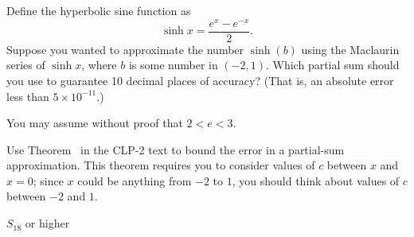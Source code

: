 \begin{question}
	Define the hyperbolic sine function as
	\[\sinh x = \frac{e^{x}-e^{-x}}{2}.\]
	Suppose you wanted to approximate the number $\sinh(b)$ using the Maclaurin series of $\sinh x$, where $b$ is some number in $(-2,1)$. Which partial sum should you use to guarantee 10 decimal places of accuracy?
	(That is, an absolute error less than $5\times10^{-11}$.)

	You may assume without proof that $2<e<3$.
\end{question}
\begin{hint}
	Use  Theorem~ in the CLP-2 text to bound the error in a partial-sum approximation.
	This theorem requires you to consider values of $c$ between $x$ and $x=0$; since $x$ could be anything from $-2$ to $1$, you should think about values of $c$ between $-2$ and $1$.
\end{hint}
\begin{answer}
$S_{18}$ or higher
\end{answer}
